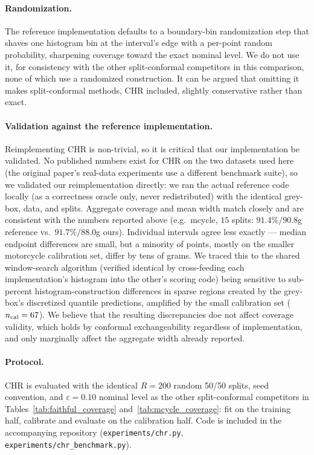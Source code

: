 \documentclass[11pt]{article}
\begin{document}
\paragraph{Randomization.}
The reference implementation defaults to a boundary-bin randomization step that
shaves one histogram bin at the interval's edge with a per-point random probability,
sharpening coverage toward the exact nominal level. We do not use it, for consistency
with the other split-conformal competitors in this comparison, none of which use a
randomized construction. It can be argued that omitting it makes split-conformal methods, CHR included,
slightly conservative rather than exact. %

\paragraph{Validation against the reference implementation.}
Reimplementing CHR is non-trivial, so it is critical that our implementation be validated.
No published numbers exist for CHR on the two datasets used here (the original paper's
real-data experiments use a different benchmark suite), so we validated our
reimplementation directly: we ran the actual reference code locally (as a
correctness oracle only, never redistributed) with the identical grey-box, data,
and splits. Aggregate coverage and mean width match closely and are consistent
with the numbers reported above (e.g.\ mcycle, $15$ splits: $91.4\%/90.8$g
reference vs.\ $91.7\%/88.0$g ours). Individual intervals agree less exactly ---
median endpoint differences are small, but a minority of points, mostly on the
smaller motorcycle calibration set, differ by tens of grams. We traced this to
the shared window-search algorithm (verified identical by cross-feeding each
implementation's histogram into the other's scoring code) being sensitive to
sub-percent histogram-construction differences in sparse regions created by the
grey-box's discretized quantile predictions, amplified by the small calibration
set ($n_{\rm cal}=67$). We believe that the resulting discrepancies doe not affect
coverage validity, which holds by conformal exchangeability regardless of 
implementation, and only marginally affect the aggregate width already reported.

\paragraph{Protocol.}
CHR is evaluated with the identical $R=200$ random 50/50 splits, seed convention,
and $\varepsilon=0.10$ nominal level as the other split-conformal competitors in
Tables~\ref{tab:faithful_coverage} and~\ref{tab:mcycle_coverage}: fit on the training
half, calibrate and evaluate on the calibration half. Code is included in the
accompanying repository (\texttt{experiments/chr.py},
\texttt{experiments/chr\_benchmark.py}).
\end{document}
